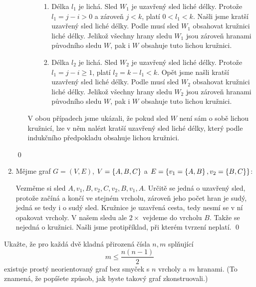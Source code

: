 \documentclass[11pt,a4paper]{article}
\begin{document}
\begin{solution}
\begin{enumerate}
\begin{enumerate}
\begin{itemize}
            \begin{enumerate}[(1)]
                \item Délka $l_1$ je lichá. Sled $W_1$ je uzavřený sled liché délky. Protože $l_1 = j-i > 0$ a zároveň 
                $j < k$, platí $0 < l_1 < k$. Našli jsme kratší uzavřený sled liché délky. Podle  musí sled $W_1$ obsahovat kružnici liché délky. Jelikož všechny hrany sledu $W_1$ jsou 
                zároveň hranami původního sledu $W$, pak i $W$ obsahuje tuto lichou kružnici.
                \item Délka $l_2$ je lichá. Sled $W_2$ je uzavřený sled liché délky. Protože $l_1 = j-i \geq 1$, platí 
                $l_2 = k-l_1 <k$. Opět jsme našli kratší uzavřený sled liché délky. Podle  
                musí sled $W_2$ obsahovat kružnici liché délky. Jelikož všechny hrany sledu $W_2$ jsou zároveň hranami
                původního sledu $W$, pak i $W$ obsahuje tuto lichou kružnici.
            \end{enumerate}
        \end{itemize}
        V obou případech jsme ukázali, že pokud sled $W$ není sám o sobě lichou kružnicí, lze v něm nalézt kratší 
        uzavřený sled liché délky, který podle indukčního předpokladu obsahuje lichou kružnici.
    \end{enumerate}
    \hspace{\fill} \qed
    \item Mějme graf $G = (V,E)$, $V=\left\lbrace A,B,C \right\rbrace$ a $E=\left\lbrace v_1=\left\lbrace A,B \right\rbrace, v_2=\left\lbrace B,C \right\rbrace \right\rbrace$:
    \begin{figure}[H]
        \centering
    \end{figure}
    Vezměme si sled $A, v_1, B, v_2, C, v_2, B, v_1, A$. Určitě se jedná o uzavřený sled, protože začíná a končí ve 
    stejném vrcholu, zároveň jeho počet hran je sudý, jedná se tedy i o sudý sled. Kružnice je uzavřená cesta, tedy
    nesmí se v ní opakovat vrcholy. V našem sledu ale $2 \times$ vejdeme do vrcholu $B$. Takže se nejedná o kružnici.
    Našli jsme protipříklad, při kterém tvrzení neplatí. 
    \hspace{\fill}\qed
\end{enumerate}
\end{solution}

\begin{exercise}
Ukažte, že pro každá dvě kladná přirozená čísla $n, m$ splňující
\begin{equation}\label{eq:1}
    m \leq \frac{n(n-1)}{2}
\end{equation}
existuje prostý neorientovaný graf bez smyček s $n$ vrcholy a $m$ hranami. (To znamená, že popíšete způsob, jak byste
takový graf zkonstruovali.)
\end{exercise}
\end{document}
